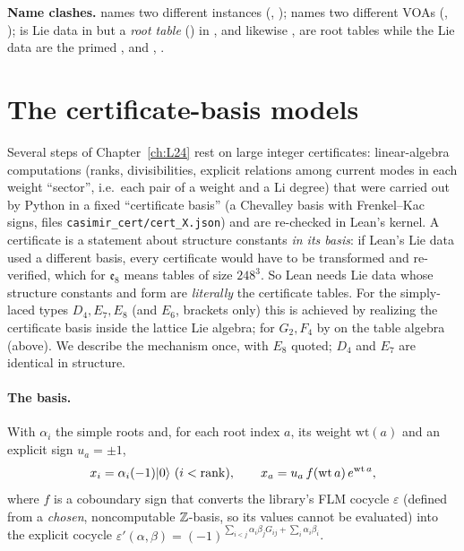 \begin{warning}[title={Trap: Coexisting models and clashing names}]
\textbf{Name clashes.}  names two different instances (, );  names
two different VOAs (, );  is Lie data in  but a \emph{root table}
() in , and likewise ,  are root tables while the Lie data are the primed
,  and , .
\end{warning}

\section{The certificate-basis models}\label{l23:sec:cert}

Several steps of Chapter~\ref{ch:L24} rest on large integer certificates: linear-algebra computations (ranks, divisibilities, explicit
relations among current modes in each weight ``sector'', i.e.\ each pair of a weight and a Li degree) that were carried out by Python in a
fixed ``certificate basis'' (a Chevalley basis with Frenkel--Kac signs, files \texttt{casimir\_cert/cert\_X.json}) and are re-checked in
Lean's kernel. A certificate is a statement about structure constants \emph{in its basis}: if Lean's Lie data used a different basis, every
certificate would have to be transformed and re-verified, which for $\mathfrak e_8$ means tables of size $248^3$. So Lean needs Lie data
whose structure constants and form are \emph{literally} the certificate tables. For the simply-laced types $D_4,E_7,E_8$ (and $E_6$, brackets only) this is achieved by realizing
the certificate basis inside the lattice Lie algebra; for $G_2,F_4$ by  on the table algebra (above). We describe the
mechanism once, with $E_8$ quoted; $D_4$ and $E_7$ are identical in structure.

\paragraph{The basis.} With $\alpha_i$ the simple roots and, for each root index $a$, its weight $\mathrm{wt}(a)$ and an explicit sign $u_a=\pm1$,
\begin{equation*}
x_i=\alpha_i(-1)\lxxiiivac\ (i<\mathrm{rank}),\qquad x_a=u_a\,f(\mathrm{wt}\,a)\,e^{\mathrm{wt}\,a},
\end{equation*}
where $f$ is a coboundary sign that converts the library's FLM cocycle $\varepsilon$ (defined from a \emph{chosen}, noncomputable
${\mathbb{Z}}$-basis, so its values cannot be evaluated) into the explicit cocycle $\varepsilon'(\alpha,\beta)=(-1)^{\sum_{i<j}\alpha_i\beta_jG_{ij}+\sum_i\alpha_i\beta_i}$.

